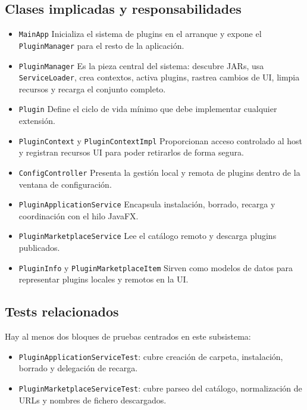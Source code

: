 \documentclass[../../main.tex]{subfiles}
\begin{document}
\subsection{Clases implicadas y responsabilidades}

\begin{itemize}
    \item \lstinline|MainApp| Inicializa el sistema de plugins en el arranque y expone el \lstinline|PluginManager| para el resto de la aplicación.
    \item \lstinline|PluginManager| Es la pieza central del sistema: descubre JARs, usa \lstinline|ServiceLoader|, crea contextos, activa plugins, rastrea cambios de UI, limpia recursos y recarga el conjunto completo.
    \item \lstinline|Plugin| Define el ciclo de vida mínimo que debe implementar cualquier extensión.
    \item \lstinline|PluginContext| y \lstinline|PluginContextImpl| Proporcionan acceso controlado al host y registran recursos UI para poder retirarlos de forma segura.
    \item \lstinline|ConfigController| Presenta la gestión local y remota de plugins dentro de la ventana de configuración.
    \item \lstinline|PluginApplicationService| Encapsula instalación, borrado, recarga y coordinación con el hilo JavaFX.
    \item \lstinline|PluginMarketplaceService| Lee el catálogo remoto y descarga plugins publicados.
    \item \lstinline|PluginInfo| y \lstinline|PluginMarketplaceItem| Sirven como modelos de datos para representar plugins locales y remotos en la UI.
\end{itemize}

\subsection{Tests relacionados}

Hay al menos dos bloques de pruebas centrados en este subsistema:

\begin{itemize}
    \item \lstinline|PluginApplicationServiceTest|: cubre creación de carpeta, instalación, borrado y delegación de recarga.
    \item \lstinline|PluginMarketplaceServiceTest|: cubre parseo del catálogo, normalización de URLs y nombres de fichero descargados.
\end{itemize}
\end{document}
